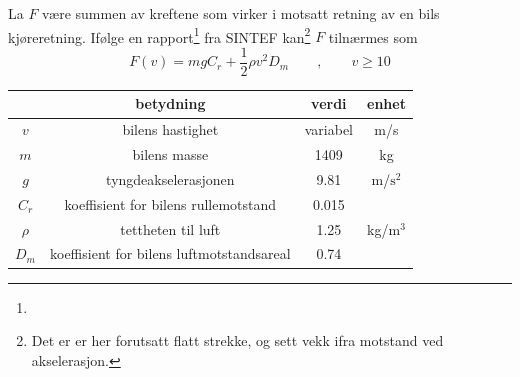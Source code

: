 \newpage
{}

La $ F $ være summen av kreftene som virker i motsatt retning av en bils kjøreretning. Ifølge en rapport\footnote{} fra SINTEF kan\footnote{Det er er her forutsatt flatt strekke, og sett vekk ifra motstand ved akselerasjon.} $ F $ tilnærmes som \vspace{-5pt}
\[ F(v)= mgC_r+\frac{1}{2}\rho v^2 D_m\qquad,\qquad v\geq10\] 
\begin{center}
	\begin{tabular}{c|c|c|c}
		& \textbf{betydning} & \textbf{verdi}&\textbf{enhet}  \\ \hline
		$ v $ & bilens hastighet & variabel& m/s \\
		$ m $& bilens masse\footnotemark & 1409 & kg\\
		$ g $& tyngdeakselerasjonen & 9.81 & m/$ \text{s}^2 $ \\
		$ C_r $ & koeffisient for bilens rullemotstand & 0.015\\
		$ \rho $ & tettheten til luft & 1.25 & kg/$ \text{m}^3 $ \\
		$ D_m $& koeffisient for bilens luftmotstandsareal\footnotemark &0.74
	\end{tabular}
\end{center} 


